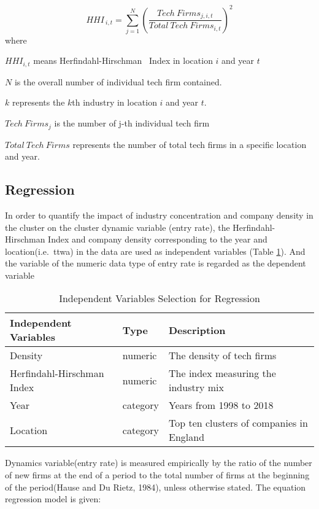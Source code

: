 \documentclass[
  12pt,
  oneside]{book}
\begin{document}
\[
HHI_{\ i,t} = \sum_{j=1}^N (\frac{Tech\ Firms_{j,i,t}}{Total\ Tech\ Firms_{i,t}})^2 
\]
where

\(HHI_{i,t}\) means Herfindahl-Hirschman ~Index in location \(i\) and year \(t\)

\(N\) is the overall number of individual tech firm contained.

\(k\) represents the \(k\)th industry in location \(i\) and year \(t\).

\(Tech\ Firms_j\) is the number of j-th individual tech firm

\(Total\ Tech\ Firms\) represents the number of total tech firms in a specific location and year.

\hypertarget{regression}{%
\subsection{Regression}\label{regression}}

In order to quantify the impact of industry concentration and company density in the cluster on the cluster dynamic variable (entry rate), the Herfindahl-Hirschman Index and company density corresponding to the year and location(i.e.~ttwa) in the data are used as independent variables (Table \ref{tab:tab-reg-idp-var}). And the variable of the numeric data type of entry rate is regarded as the dependent variable

\begin{table}

\caption{\label{tab:tab-reg-idp-var}Independent Variables Selection for Regression}
\centering
\begin{tabular}[t]{lll}
\toprule
\textbf{Independent Variables} & \textbf{Type} & \textbf{Description}\\
\midrule
Density & numeric & The density of tech firms\\
Herfindahl-Hirschman Index & numeric & The index measuring the industry mix\\
Year & category & Years from 1998 to 2018\\
Location & category & Top ten clusters of companies in England\\
\bottomrule
\end{tabular}
\end{table}

Dynamics variable(entry rate) is measured empirically by the ratio of the number of new firms at the end of a period to the total number of firms at the beginning of the period(Hause and Du Rietz, 1984), unless otherwise stated. The equation regression model is given:
\end{document}
